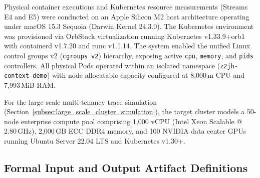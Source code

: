 

Physical container executions and Kubernetes resource measurements (Streams E4 and E5) were conducted on an Apple Silicon M2 host architecture operating under macOS 15.3 Sequoia (Darwin Kernel 24.3.0). The Kubernetes environment was provisioned via OrbStack virtualization running Kubernetes v1.33.9+orb1 with containerd v1.7.20 and runc v1.1.14. The system enabled the unified Linux control groups v2 (\texttt{cgroups v2}) hierarchy, exposing active \texttt{cpu}, \texttt{memory}, and \texttt{pids} controllers. All physical Pods operated within an isolated namespace (\texttt{z2jh-context-demo}) with node allocatable capacity configured at 8,000\,m CPU and 7,993\,MiB RAM.

For the large-scale multi-tenancy trace simulation (Section~\ref{subsec:large_scale_cluster_simulation}), the target cluster models a 50-node enterprise compute pool comprising 1,000 vCPU (Intel Xeon Scalable @ 2.80\,GHz), 2,000\,GB ECC DDR4 memory, and 100 NVIDIA data center GPUs running Ubuntu Server 22.04 LTS and Kubernetes v1.30+.

\subsection{Formal Input and Output Artifact Definitions}
\label{subsec:input_output_definitions}

